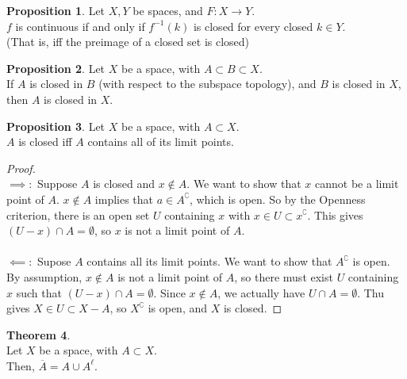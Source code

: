 \documentclass[a5paper]{article}
\theoremstyle{definition}%
\newtheorem{theorem}{Theorem}
\newtheorem{proposition}[theorem]{Proposition}
\numberwithin{exercise}{section}
\theoremstyle{remark}%
\begin{document}
\begin{highlight}
\begin{proposition}Let $X,Y$ be spaces, and $F:X\to Y$.\\
$f$ is continuous if and only if $f^{-1}(k)$ is closed for every closed $k \in Y$. \\
(That is, iff the preimage of a closed set is closed)
\end{proposition}
\end{highlight}

\begin{proposition}Let $X$ be a space, with $A \subset B \subset X$. \\
If $A$ is closed in $B$ (with respect to the subspace topology), and $B$ is closed in $X$, then $A$ is closed in $X$. 
\end{proposition}

\begin{highlight}
\begin{proposition}
Let  $X$ be a space, with $A \subset X$. \\
$A$ is closed iff $A$ contains all of its limit points. 
\end{proposition}
\end{highlight}
\begin{proof}\mbox{}\\
$\implies:$ Suppose $A$ is closed and $x \not\in A$. We want to show that $x$ cannot be a limit point of $A$. $x \not\in A$ implies that $a \in A^\complement$, which is open. So by the Openness criterion, there is an open set $U$ containing $x$ with $x \in U \subset x^\complement. $ This gives $(U-x)\cap A = \emptyset$, so $x$ is not a limit point of $A$. \\
\\
$\impliedby:$ Supose $A$ contains all its limit points. We want to show that $A^\complement$ is open. By assumption, $x \not\in A$ is not a limit point of $A$, so there must exist $U$ containing $x$ such that  $(U-x)\cap A = \emptyset$. Since $x\not\in A$, we actually have $U\cap A=\emptyset$. Thu gives $X \in U \subset X - A$, so $X^\complement$ is open, and $X$ is closed. 
\end{proof}

\begin{theorem}\mbox{}\\
Let  $X$ be a space, with $A \subset X$. \\
Then, $\overline{A}=A\cup A^\ell$.
\end{theorem}
\end{document}
